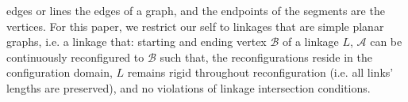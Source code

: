 edges or lines
the edges of a graph, and the endpoints of the segments are the vertices. For this paper, we 
restrict our self to linkages that are simple planar graphs, i.e. a linkage that:
starting and ending vertex
$\mathcal{B}$ of a linkage $L$, $\mathcal{A}$ can be continuously reconfigured to $\mathcal{B}$ such 
that, the reconfigurations reside in the configuration domain, $L$ remains rigid throughout 
reconfiguration (i.e. all links' lengths are preserved), and no violations of linkage intersection 
conditions. 
